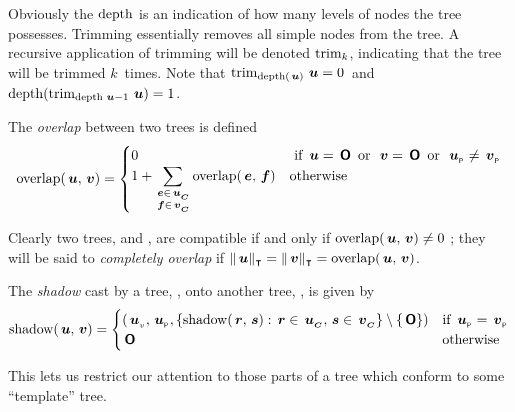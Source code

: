 Obviously the $\depth$ is an indication of how many levels of nodes
the tree possesses. Trimming essentially removes all simple nodes from the tree.
 A recursive application
of trimming will be denoted \(\trim_{k}\), indicating that the tree
 will be trimmed \(k\)\ times. Note that
\(\trim_{\depth(\node{u})}{\node{u}} = 0\)\ and
\(\depth(\trim_{\depth{\node{u}}-1}{\node{u}}) = 1\).

\begin{definition}
The \emph{overlap} between two trees is defined
\[
  \overlap(\node{u},\node{v}) = \begin{cases}
    0 & \text{ if } \node{u} = \zerotree \mor \node{v} = \zerotree \mor \nlabel{u} \neq \nlabel{v} \\
    1 + \displaystyle\sum_{\substack{\node{e}\in\child{u} \\
        \node{f}\in\child{v}}} \overlap(\node{e},\node{f}) & \text{otherwise}
  \end{cases}
\]

Clearly two trees,  and , are compatible if and only if \(\overlap(\node{u},\node{v}) \neq 0 \) ; they will
be said to \emph{completely overlap} if \(\Tcard{\node{u}} = \Tcard{\node{v}} =
\overlap(\node{u},\node{v})\).
\end{definition}

\begin{definition}
The \emph{shadow} cast by a tree, , onto another tree,
, is given by
\[
\shadow(\node{u},\node{v}) = \begin{cases}
  \left(\nv{u},\nlabel{u},\{\shadow(\node{r},\node{s}):\node{r}\in\child{u},\node{s}\in\child{v}\}\setminus\{\zerotree\}\right)&\text{if~}\nlabel{u}=\nlabel{v}\\
  \zerotree&\text{otherwise}
\end{cases}
\]
\end{definition}
This lets us restrict our attention to those parts of a tree which
conform to some ``template'' tree.  

